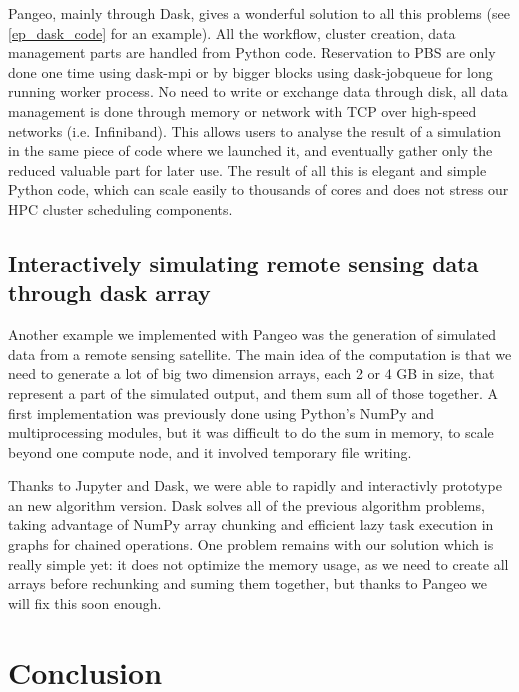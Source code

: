 \documentclass{article}
\begin{document}
Pangeo, mainly through Dask, gives a wonderful solution to all this problems (see \ref{ep_dask_code} for an example). All the workflow, cluster creation, data management parts are handled from Python code. Reservation to PBS are only done one time using dask-mpi or by bigger blocks using dask-jobqueue for long running worker process. No need to write or exchange data through disk, all data management is done through memory or network with TCP over high-speed networks (i.e. Infiniband). This allows users to analyse the result of a simulation in the same piece of code where we launched it, and eventually gather only the reduced valuable part for later use. The result of all this is elegant and simple Python code, which can scale easily to thousands of cores and does not stress our HPC cluster scheduling components.

\subsection{Interactively simulating remote sensing data through dask array}
\label{ssec:usecase2}

Another example we implemented with Pangeo was the generation of simulated data from a remote sensing satellite. The main idea of the computation is that we need to generate a lot of big two dimension arrays, each 2 or 4 GB in size, that represent a part of the simulated output, and them sum all of those together. A first implementation was previously done using Python's NumPy and multiprocessing modules, but it was difficult to do the sum in memory, to scale beyond one compute node, and it involved temporary file writing.

Thanks to Jupyter and Dask, we were able to rapidly and interactivly prototype an new algorithm version. Dask solves all of the previous algorithm problems, taking advantage of NumPy array chunking and efficient lazy task execution in graphs for chained operations. One problem remains with our solution which is really simple yet: it does not optimize the memory usage, as we need to create all arrays before rechunking and suming them together, but thanks to Pangeo we will fix this soon enough.

\section{Conclusion}
\label{sec:conclusion}
\end{document}
